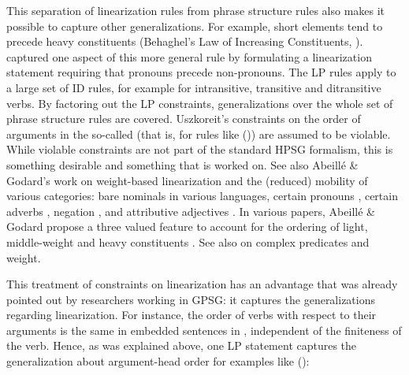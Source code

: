 \documentclass[output=paper,biblatex,babelshorthands,newtxmath,draftmode,colorlinks,citecolor=brown]{langscibook}
\begin{document}
This separation of linearization rules from phrase structure rules also makes it possible to capture
other generalizations. For example, short elements tend to precede heavy constituents (Behaghel's
Law of Increasing Constituents, \citealp[]{Behaghel09a}). \citet[Chapter~5]{Uszkoreit87a}
captured one aspect of this more general rule by formulating a linearization statement requiring
that pronouns precede non-pronouns. The LP rules apply to a large set of ID rules, for example for
intransitive, transitive and ditransitive verbs. By factoring out the LP constraints,
generalizations over the whole set of phrase structure rules are covered.  Uszkoreit's constraints
on the order of arguments in the so-called \mf (that is, for rules like ()) are assumed to be
violable. While violable constraints are not part of the standard HPSG formalism, this is something
desirable and something that is worked on. See also Abeillé \& Godard's work on weight-based
linearization and the (reduced) mobility of various categories: bare nominals in various languages,
certain pronouns \citep{AG99a-u}, certain adverbs \citep{AG2001a-u}, negation
\citep{AG97a-u,AG2004a-u}, and attributive adjectives \citep{AG99b-u}. In various papers, Abeillé \&
Godard propose a three valued  feature to account for the ordering of light,
middle-weight and heavy constituents \citep{AG2000a,AG2004a-u}. See also
 on complex
  predicates and weight.

\largerpage
This treatment of constraints on linearization has an advantage that was already pointed out by
researchers working in GPSG: it captures the generalizations regarding linearization. For instance,
the order of verbs with respect to their arguments is the same in embedded sentences in
, independent of the finiteness of the verb. Hence, as was explained above, one LP
statement captures the generalization about argument-head order for examples like ():
\end{document}
